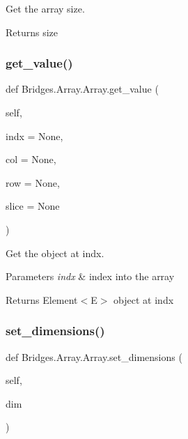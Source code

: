 Get the array size. 

\begin{DoxyReturn}{Returns}
size 
\end{DoxyReturn}
\mbox{\label{class_bridges_1_1_array_1_1_array_a45379fc5c5b5c039ac75b01cd40195dd}} 
\subsubsection{\texorpdfstring{get\+\_\+value()}{get\_value()}}
{\footnotesize\ttfamily def Bridges.\+Array.\+Array.\+get\+\_\+value (\begin{DoxyParamCaption}\item[{}]{self,  }\item[{}]{indx = {\ttfamily None},  }\item[{}]{col = {\ttfamily None},  }\item[{}]{row = {\ttfamily None},  }\item[{}]{slice = {\ttfamily None} }\end{DoxyParamCaption})}



Get the object at \textquotesingle{}indx\textquotesingle{}. 


\begin{DoxyParams}{Parameters}
{\em indx} & index into the array \\
\hline
\end{DoxyParams}
\begin{DoxyReturn}{Returns}
Element$<$\+E$>$ object at \textquotesingle{}indx\textquotesingle{} 
\end{DoxyReturn}
\mbox{\label{class_bridges_1_1_array_1_1_array_a496265932c2d4eeefd3605210afb93f9}} 
\subsubsection{\texorpdfstring{set\+\_\+dimensions()}{set\_dimensions()}}
{\footnotesize\ttfamily def Bridges.\+Array.\+Array.\+set\+\_\+dimensions (\begin{DoxyParamCaption}\item[{}]{self,  }\item[{}]{dim }\end{DoxyParamCaption})}



